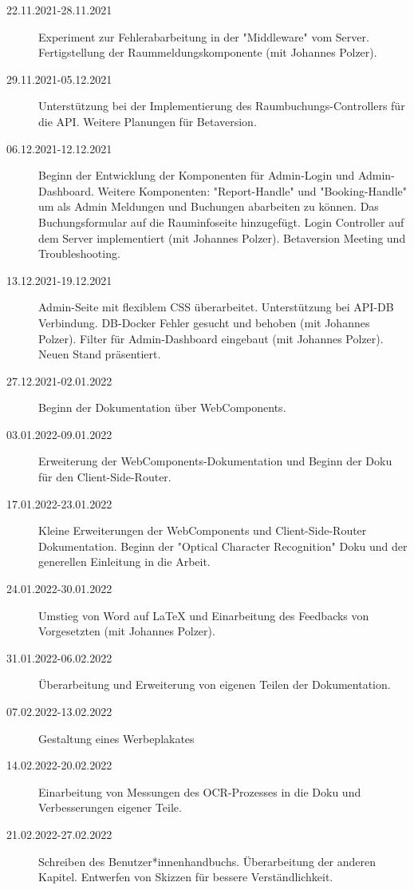 \begin{description}
    \item[22.11.2021-28.11.2021] Experiment zur Fehlerabarbeitung in der "Middleware" vom Server. Fertigstellung der Raummeldungskomponente (mit Johannes Polzer).
    \item[29.11.2021-05.12.2021] Unterstützung bei der Implementierung des Raumbuchungs-Controllers für die API. Weitere Planungen für Betaversion.
    \item[06.12.2021-12.12.2021] Beginn der Entwicklung der Komponenten für Admin-Login und Admin-Dashboard. Weitere Komponenten: "Report-Handle" und "Booking-Handle" um als Admin Meldungen und Buchungen abarbeiten zu können. Das Buchungsformular auf die Rauminfoseite hinzugefügt. Login Controller auf dem Server implementiert (mit Johannes Polzer). Betaversion Meeting und Troubleshooting.
    \item[13.12.2021-19.12.2021] Admin-Seite mit flexiblem CSS überarbeitet. Unterstützung bei API-DB Verbindung. DB-Docker Fehler gesucht und behoben (mit Johannes Polzer). Filter für Admin-Dashboard eingebaut (mit Johannes Polzer). Neuen Stand präsentiert.
    \item[27.12.2021-02.01.2022] Beginn der Dokumentation über WebComponents.
    \item[03.01.2022-09.01.2022] Erweiterung der WebComponents-Dokumentation und Beginn der Doku für den Client-Side-Router.
    \item[17.01.2022-23.01.2022] Kleine Erweiterungen der WebComponents und Client-Side-Router Dokumentation. Beginn der "Optical Character Recognition" Doku und der generellen Einleitung in die Arbeit. 
    \item[24.01.2022-30.01.2022] Umstieg von Word auf LaTeX und Einarbeitung des Feedbacks von Vorgesetzten (mit Johannes Polzer). 
    \item[31.01.2022-06.02.2022] Überarbeitung und Erweiterung von eigenen Teilen der Dokumentation. 
    \item[07.02.2022-13.02.2022] Gestaltung eines Werbeplakates
    \item[14.02.2022-20.02.2022] Einarbeitung von Messungen des OCR-Prozesses in die Doku und Verbesserungen eigener Teile.
    \item[21.02.2022-27.02.2022] Schreiben des Benutzer*innenhandbuchs. Überarbeitung der anderen Kapitel. Entwerfen von Skizzen für bessere Verständlichkeit.
\end{description}